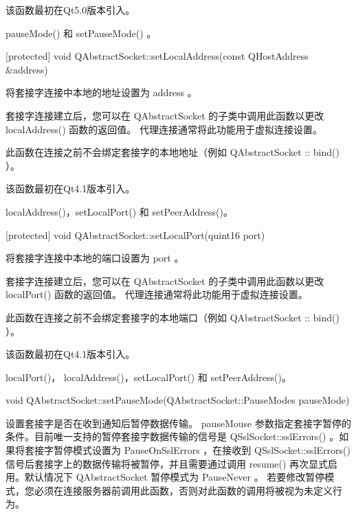 该函数最初在Qt5.0版本引入。



\begin{notice}[另请查阅]
pauseMode() 和 setPauseMode() 。
\end{notice}


[protected] void QAbstractSocket::setLocalAddress(const QHostAddress
\&address)

将套接字连接中本地的地址设置为 address 。

套接字连接建立后，您可以在 QAbstractSocket 的子类中调用此函数以更改 localAddress() 函数的返回值。 代理连接通常将此功能用于虚拟连接设置。

\begin{notice}
此函数在连接之前不会绑定套接字的本地地址（例如 QAbstractSocket :: bind() ）。
\end{notice}

该函数最初在Qt4.1版本引入。


\begin{notice}[另请查阅]
 localAddress()，setLocalPort() 和 setPeerAddress()。
\end{notice}

[protected] void QAbstractSocket::setLocalPort(quint16 port)

将套接字连接中本地的端口设置为 port 。

套接字连接建立后，您可以在 QAbstractSocket 的子类中调用此函数以更改 localPort() 函数的返回值。 代理连接通常将此功能用于虚拟连接设置。

\begin{notice}
此函数在连接之前不会绑定套接字的本地端口（例如 QAbstractSocket :: bind() ）。
\end{notice}

该函数最初在Qt4.1版本引入。

\begin{notice}[另请查阅]
localPort()， localAddress()，setLocalPort() 和  setPeerAddress()。
\end{notice}

void QAbstractSocket::setPauseMode(QAbstractSocket::PauseModes
pauseMode)

设置套接字是否在收到通知后暂停数据传输。 pauseMouse 参数指定套接字暂停的条件。目前唯一支持的暂停套接字数据传输的信号是 QSslSocket::sslErrors() 。如果将套接字暂停模式设置为 PauseOnSslErrors ，在接收到 QSslSocket::sslErrors() 信号后套接字上的数据传输将被暂停，并且需要通过调用 resume() 再次显式启用。默认情况下 QAbstractSocket 暂停模式为 PauseNever 。 若要修改暂停模式，您必须在连接服务器前调用此函数，否则对此函数的调用将被视为未定义行为。

